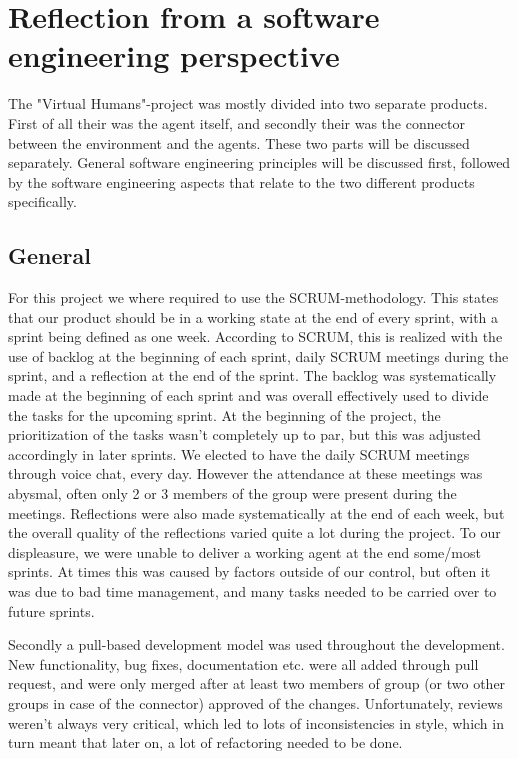 \chapter{Reflection from a software engineering perspective}
\label{sec:Reflection from a software engineering perspective}

The "Virtual Humans"-project was mostly divided into two separate products.
First of all their was the agent itself, and secondly their was the connector between the environment and the agents.
These two parts will be discussed separately. General software engineering principles will be  discussed first,
followed by the software engineering aspects that relate to the two different products specifically.

\section{General}
\label{sub:General}

For this project we where required to use the SCRUM-methodology. This states that our product should be in a working state at the end of every sprint, with a sprint being defined as one week.
According to SCRUM, this is realized with the use of backlog at the beginning of each sprint, daily SCRUM meetings during the sprint, and a reflection at the end of the sprint.
The backlog was systematically made at the beginning of each sprint and was overall effectively used to divide the tasks for the upcoming sprint.
At the beginning of the project, the prioritization of the tasks wasn't completely up to par, but this was adjusted accordingly in later sprints.
We elected to have the daily SCRUM meetings through voice chat, every day. However the attendance at these meetings was abysmal, often only 2 or 3 members of the group were present during the meetings.
Reflections were also made systematically at the end of each week, but the overall quality of the reflections varied quite a lot during the project.
To our displeasure, we were unable to deliver a working agent at the end some/most sprints. At times this was caused by factors outside of our control, but often it was due to bad time management,
and many tasks needed to be carried over to future sprints.

Secondly a pull-based development model was used throughout the development. New functionality, bug fixes, documentation etc. were all added through pull request, and were only merged after at least
two members of group (or two other groups in case of the connector) approved of the changes.
Unfortunately, reviews weren't always very critical, which led to lots of inconsistencies in style, which in turn meant that later on, a lot of refactoring needed to be done.

